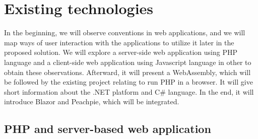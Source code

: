 \chapter{Existing technologies}

In the beginning, we will observe conventions in web applications, and we will map ways of user interaction with the applications to utilize it later in the proposed solution.
We will explore a server-side web application using PHP language and a client-side web application using Javascript language in other to obtain these observations.
Afterward, it will present a WebAssembly, which will be followed by the existing project relating to run PHP in a browser.
It will give short information about the .NET platform and C\# language.
In the end, it will introduce Blazor and Peachpie, which will be integrated.
\section{PHP and server-based web application}

